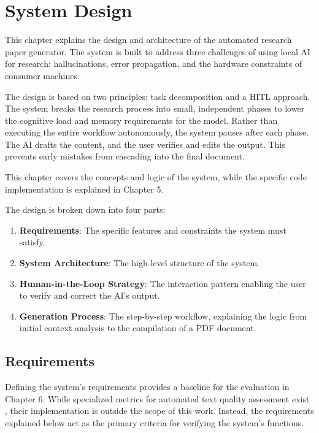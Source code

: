 \chapter{System Design}

This chapter explains the design and architecture of the automated research paper generator.
The system is built to address three challenges of using local AI for research: hallucinations, error propagation, and the hardware constraints of consumer machines.

The design is based on two principles: task decomposition and a HITL approach.
The system breaks the research process into small, independent phases to lower the cognitive load and memory requirements for the model.
Rather than executing the entire workflow autonomously, the system pauses after each phase.
The AI drafts the content, and the user verifies and edits the output.
This prevents early mistakes from cascading into the final document.

This chapter covers the concepts and logic of the system, while the specific code implementation is explained in Chapter 5.

The design is broken down into four parts:
\begin{enumerate}
    \item \textbf{Requirements}: The specific features and constraints the system must satisfy.
    \item \textbf{System Architecture}: The high-level structure of the system.
    \item \textbf{Human-in-the-Loop Strategy}: The interaction pattern enabling the user to verify and correct the AI's output.
    \item \textbf{Generation Process}: The step-by-step workflow, explaining the logic from initial context analysis to the compilation of a PDF document.
\end{enumerate}

\section{Requirements}

Defining the system's requirements provides a baseline for the evaluation in Chapter 6.
While specialized metrics for automated text quality assessment exist \cite{Jourdan2025IdentifyingRE}, their implementation is outside the scope of this work.
Instead, the requirements explained below act as the primary criteria for verifying the system's functions.

